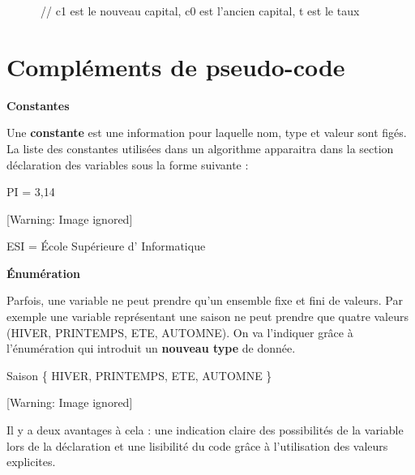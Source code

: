 {\sffamily
\ \ \ \ \ \ // c1 est le nouveau capital, c0 est l’ancien capital, t est
le taux}

\section{Compléments de pseudo-code}
{
}

{\sffamily\bfseries\upshape
Constantes}

{
Une \textbf{constante} est une information pour laquelle nom, type et
valeur sont figés. La liste des constantes utilisées dans un algorithme
apparaitra dans la section déclaration des variables sous la forme
suivante :}

{\sffamily
{} PI = 3,14}

\begin{center}
 [Warning: Image ignored] %

\end{center}
{\sffamily
{} ESI = {\textquotedbl}École Supérieure d’
Informatique{\textquotedbl}}

{
}

{\sffamily\bfseries\upshape
Énumération}

{
Parfois, une variable ne peut prendre qu'un ensemble
fixe et fini de valeurs. Par exemple une variable représentant une
saison ne peut prendre que quatre valeurs (HIVER, PRINTEMPS, ETE,
AUTOMNE). On va l'indiquer grâce à
l'énumération qui introduit un \textbf{nouveau type}
de donnée.}

{\sffamily
{} Saison \{ HIVER, PRINTEMPS, ETE, AUTOMNE \}
}

\begin{center}
 [Warning: Image ignored] %

\end{center}
{
Il y a deux avantages à cela : une indication claire des possibilités de
la variable lors de la déclaration et une lisibilité du code grâce à
l'utilisation des valeurs explicites.}

